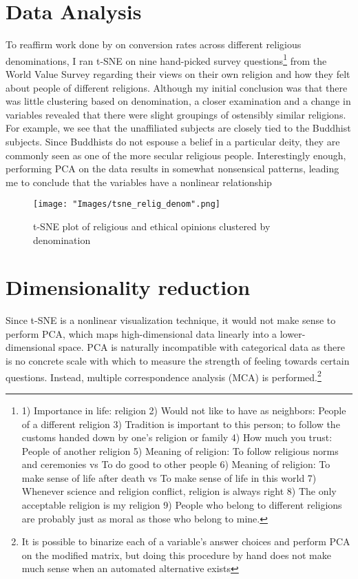 \documentclass{article}
\begin{document}
	\section{Data Analysis}
	To reaffirm work done by \cite{relig_convert} on conversion rates across different religious denominations, I ran t-SNE on nine hand-picked survey questions\footnote{ 1) Importance in life: religion 2) Would not like to have as neighbors: People of a different religion 3) Tradition is important to this person; to follow the customs handed down by one’s religion or family 4) How much you trust: People of another religion 5) Meaning of religion: To follow religious norms and ceremonies vs To do good to other people 6) Meaning of religion: To make sense of life after death vs To make sense of life in this world 7) Whenever science and religion conflict, religion is always right 8) The only acceptable religion is my religion 9) People who belong to different religions are probably just as moral as those who belong to mine.} from the World Value Survey regarding their views on their own religion and how they felt about people of different religions. Although my initial conclusion was that there was little clustering based on denomination, a closer examination and a change in variables revealed that there were slight groupings of ostensibly similar religions. For example, we see that the unaffiliated subjects are closely tied to the Buddhist subjects. Since Buddhists do not espouse a belief in a particular deity, they are commonly seen as one of the more secular religious people. Interestingly enough, performing PCA on the data results in somewhat nonsensical patterns, leading me to conclude that the variables have a nonlinear relationship
	
	\begin{figure}[t]
		\centering
		\texttt{[image: "Images/tsne\_relig\_denom".png]}
		\caption{t-SNE plot of religious and ethical opinions clustered by denomination}
	\end{figure}

	\section{Dimensionality reduction}
	Since t-SNE is a nonlinear visualization technique, it would not make sense to perform PCA, which maps high-dimensional data linearly into a lower-dimensional space. PCA is naturally incompatible with categorical data as there is no concrete scale with which to measure the strength of feeling towards certain questions. Instead, multiple correspondence analysis (MCA) is performed.\footnote{It is possible to binarize each of a variable's answer choices and perform PCA on the modified matrix, but doing this procedure by hand does not make much sense when an automated alternative exists} 
\end{document}
